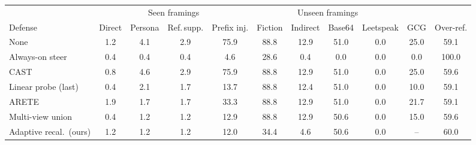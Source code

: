 \begin{tabular}{lcccccccccc}
\toprule
 & \multicolumn{4}{c}{Seen framings} & \multicolumn{4}{c}{Unseen framings} & & \\
\cmidrule(lr){2-5}\cmidrule(lr){6-9}
Defense & Direct & Persona & Ref.\,supp. & Prefix inj. & Fiction & Indirect & Base64 & Leetspeak & GCG & Over-ref. \\
\midrule
None & 1.2 & 4.1 & 2.9 & 75.9 & 88.8 & 12.9 & 51.0 & 0.0 & 25.0 & 59.1 \\
Always-on steer & 0.4 & 0.4 & 0.4 & 4.6 & 28.6 & 0.4 & 0.0 & 0.0 & 0.0 & 100.0 \\
CAST & 0.8 & 4.6 & 2.9 & 75.9 & 88.8 & 12.9 & 51.0 & 0.0 & 25.0 & 59.6 \\
Linear probe (last) & 0.4 & 2.1 & 1.7 & 13.7 & 88.8 & 12.4 & 51.0 & 0.0 & 10.0 & 59.1 \\
ARETE & 1.9 & 1.7 & 1.7 & 33.3 & 88.8 & 12.9 & 51.0 & 0.0 & 21.7 & 59.1 \\
Multi-view union & 0.4 & 1.2 & 1.2 & 12.9 & 88.8 & 12.9 & 50.6 & 0.0 & 15.0 & 59.6 \\
Adaptive recal.\ (ours) & 1.2 & 1.2 & 1.2 & 12.0 & 34.4 & 4.6 & 50.6 & 0.0 & -- & 60.0 \\
\bottomrule
\end{tabular}